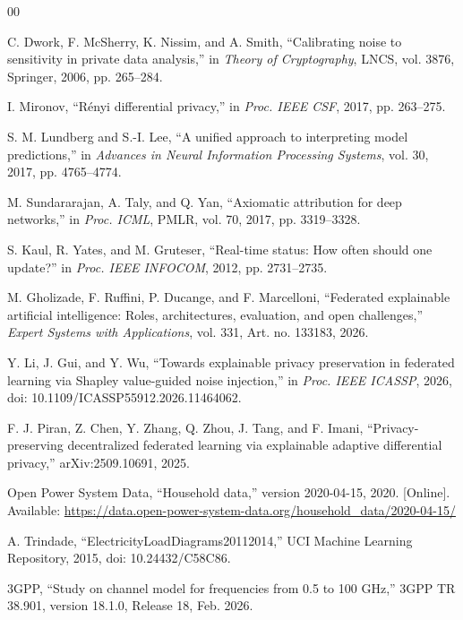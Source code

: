 \documentclass[conference]{IEEEtran}
\begin{document}
\begin{thebibliography}{00}

C. Dwork, F. McSherry, K. Nissim, and A. Smith, ``Calibrating noise to
sensitivity in private data analysis,'' in \emph{Theory of Cryptography},
LNCS, vol. 3876, Springer, 2006, pp. 265--284.

I. Mironov, ``R\'enyi differential privacy,'' in \emph{Proc. IEEE CSF},
2017, pp. 263--275.

S. M. Lundberg and S.-I. Lee, ``A unified approach to interpreting model
predictions,'' in \emph{Advances in Neural Information Processing
Systems}, vol. 30, 2017, pp. 4765--4774.

M. Sundararajan, A. Taly, and Q. Yan, ``Axiomatic attribution for deep
networks,'' in \emph{Proc. ICML}, PMLR, vol. 70, 2017, pp. 3319--3328.

S. Kaul, R. Yates, and M. Gruteser, ``Real-time status: How often should
one update?'' in \emph{Proc. IEEE INFOCOM}, 2012, pp. 2731--2735.

M. Gholizade, F. Ruffini, P. Ducange, and F. Marcelloni, ``Federated
explainable artificial intelligence: Roles, architectures, evaluation,
and open challenges,'' \emph{Expert Systems with Applications}, vol. 331,
Art. no. 133183, 2026.

Y. Li, J. Gui, and Y. Wu, ``Towards explainable privacy preservation in
federated learning via Shapley value-guided noise injection,'' in
\emph{Proc. IEEE ICASSP}, 2026, doi: 10.1109/ICASSP55912.2026.11464062.

F. J. Piran, Z. Chen, Y. Zhang, Q. Zhou, J. Tang, and F. Imani,
``Privacy-preserving decentralized federated learning via explainable
adaptive differential privacy,'' arXiv:2509.10691, 2025.

Open Power System Data, ``Household data,'' version 2020-04-15, 2020.
[Online]. Available:
\url{https://data.open-power-system-data.org/household_data/2020-04-15/}

A. Trindade, ``ElectricityLoadDiagrams20112014,'' UCI Machine Learning
Repository, 2015, doi: 10.24432/C58C86.

3GPP, ``Study on channel model for frequencies from 0.5 to 100 GHz,''
3GPP TR 38.901, version 18.1.0, Release 18, Feb. 2026.


\end{thebibliography}
\end{document}
